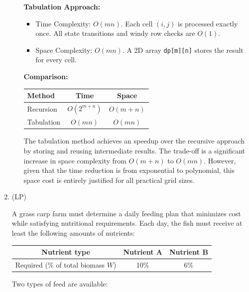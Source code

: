 \documentclass[12pt,a4paper]{article}
\theoremstyle{definition}
\begin{document}
\begin{enumerate}
\begin{enumerate}
        \textbf{Tabulation Approach:}
        \begin{itemize}
            \item Time Complexity: $O(mn)$. Each cell $(i,j)$ is processed exactly once. All state transitions and windy row checks are $O(1)$.
            \item Space Complexity: $O(mn)$. A 2D array \texttt{dp[m][n]} stores the result for every cell.
        \end{itemize}
        
        \textbf{Comparison:}
        \begin{center}
        \begin{tabular}{|l|c|c|}
            \hline
            \textbf{Method} & \textbf{Time} & \textbf{Space} \\
            \hline
            Recursion & $O(2^{m+n})$ & $O(m+n)$ \\
            Tabulation  & $O(mn)$      & $O(mn)$ \\
            \hline
        \end{tabular}
        \end{center}
        The tabulation method achieves an speedup over the recursive approach by storing and reusing intermediate results. The trade-off is a significant increase in space complexity from $O(m+n)$ to $O(mn)$. However, given that the time reduction is from exponential to polynomial, this space cost is entirely justified for all practical grid sizes.
        
    \end{enumerate}

    \item {\color{purple}(LP)}

    A grass carp farm must determine a daily feeding plan that minimizes cost while satisfying nutritional requirements. Each day, the fish must receive at least the following amounts of nutrients:
    \vspace{-0.1cm}
    \begin{center}
    \begin{tabular}{|c|c|c|}
    \hline
    Nutrient type & Nutrient A & Nutrient B \\
    \hline
    Required (\% of total biomass $W$) & 10\% & 6\% \\
    \hline
    \end{tabular}
    \end{center}
    \vspace{-0.1cm}
    Two types of feed are available:
    

\end{enumerate}
\end{document}
